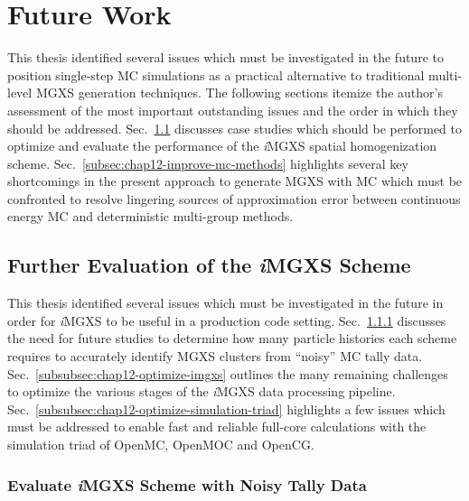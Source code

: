 \section{Future Work}
\label{sec:chap12-future-work}

This thesis identified several issues which must be investigated in the future to position single-step \ac{MC} simulations as a practical alternative to traditional multi-level \ac{MGXS} generation techniques. The following sections itemize the author's assessment of the most important outstanding issues and the order in which they should be addressed. Sec.~\ref{subsec:chap12-further-imgxs} discusses case studies which should be performed to optimize and evaluate the performance of the \textit{i}\ac{MGXS} spatial homogenization scheme. Sec.~\ref{subsec:chap12-improve-mc-methods} highlights several key shortcomings in the present approach to generate \ac{MGXS} with \ac{MC} which must be confronted to resolve lingering sources of approximation error between continuous energy \ac{MC} and deterministic multi-group methods.

\subsection{Further Evaluation of the \textit{i}MGXS Scheme}
\label{subsec:chap12-further-imgxs}

This thesis identified several issues which must be investigated in the future in order for \textit{i}\ac{MGXS} to be useful in a production code setting. Sec.~\ref{subsubsec:chap12-imgxs-noisy-mc-data} discusses the need for future studies to determine how many particle histories each scheme requires to accurately identify \ac{MGXS} clusters from ``noisy'' \ac{MC} tally data. Sec.~\ref{subsubsec:chap12-optimize-imgxs} outlines the many remaining challenges to optimize the various stages of the \textit{i}\ac{MGXS} data processing pipeline. Sec.~\ref{subsubsec:chap12-optimize-simulation-triad} highlights a few issues which must be addressed to enable fast and reliable full-core calculations with the simulation triad of OpenMC, OpenMOC and OpenCG.

\subsubsection{Evaluate \textit{i}MGXS Scheme with Noisy Tally Data}
\label{subsubsec:chap12-imgxs-noisy-mc-data}

